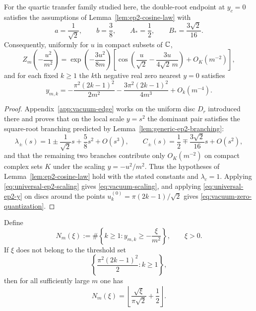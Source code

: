 \begin{theorem}\label{thm:vacuum-zero-quantization}
For the quartic transfer family studied here, the double-root endpoint at $y_c=0$ satisfies the assumptions of Lemma~\ref{lem:ep2-cosine-law} with
\[
a=\frac{1}{\sqrt2},
\qquad
b=\frac38,
\qquad
A_*=\frac12,
\qquad
B_*=\frac{3\sqrt2}{16}.
\]
Consequently, uniformly for \(u\) in compact subsets of \(\mathbb{C}\),
\begin{equation}\label{eq:vacuum-scaling}
Z_m\!\left(-\frac{u^2}{m^2}\right)
=
\exp\!\left(-\frac{3u^2}{8m}\right)
\left[
\cos\!\left(\frac{u}{\sqrt{2}}-\frac{3u}{4\sqrt{2}\,m}\right)
+ O_K(m^{-2})
\right],
\end{equation}
and for each fixed $k\ge 1$ the $k$th negative real zero nearest $y=0$ satisfies
\begin{equation}\label{eq:vacuum-zero-quantization}
y_{m,k}
=
-\frac{\pi^2(2k-1)^2}{2m^2}
-\frac{3\pi^2(2k-1)^2}{4m^3}
+ O_k(m^{-4}).
\end{equation}
\end{theorem}

\begin{proof}
Appendix~\ref{app:vacuum-edge} works on the uniform disc $D_r$ introduced there and proves that on the local scale \(y=s^2\) the dominant pair satisfies the square-root branching predicted by Lemma~\ref{lem:generic-ep2-branching}:
\[
\lambda_\pm(s)=1\pm \frac{1}{\sqrt2}s+\frac58 s^2+O(s^3),
\qquad
C_\pm(s)=\frac12\mp \frac{3\sqrt2}{16}s+O(s^2),
\]
and that the remaining two branches contribute only \(O_K(m^{-2})\) on compact complex sets \(K\) under the scaling \(y=-u^2/m^2\).
Thus the hypotheses of Lemma~\ref{lem:ep2-cosine-law} hold with the stated constants and \(\lambda_c=1\).
Applying \eqref{eq:universal-ep2-scaling} gives \eqref{eq:vacuum-scaling}, and applying \eqref{eq:universal-ep2-y} on discs around the points \(u_k^{(0)}=\pi(2k-1)/\sqrt2\) gives \eqref{eq:vacuum-zero-quantization}.
\end{proof}

\begin{corollary}\label{cor:edge-zero-counting}
Define
\[
N_m(\xi)
:=
\#\left\{
k\ge 1:
y_{m,k}\ge -\frac{\xi}{m^2}
\right\},
\qquad
\xi>0.
\]
If $\xi$ does not belong to the threshold set
\[
\left\{
\frac{\pi^2(2k-1)^2}{2}:k\ge1
\right\},
\]
then for all sufficiently large $m$ one has
\begin{equation}\label{eq:edge-counting-law}
N_m(\xi)
=
\left\lfloor
\frac{\sqrt{\xi}}{\pi\sqrt2}+\frac12
\right\rfloor.
\end{equation}
\end{corollary}

